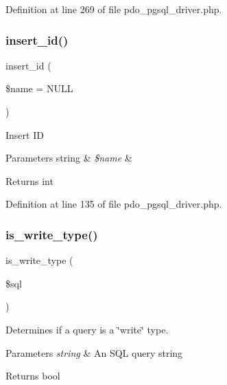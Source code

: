 Definition at line 269 of file pdo\+\_\+pgsql\+\_\+driver.\+php.

\mbox{\label{class_c_i___d_b__pdo__pgsql__driver_ae61dc2c85e5516f143f6246c686bc3fc}} 
\subsubsection{\texorpdfstring{insert\_id()}{insert\_id()}}
{\footnotesize\ttfamily insert\+\_\+id (\begin{DoxyParamCaption}\item[{}]{\$name = {\ttfamily NULL} }\end{DoxyParamCaption})}

Insert ID


\begin{DoxyParams}[1]{Parameters}
string & {\em \$name} & \\
\hline
\end{DoxyParams}
\begin{DoxyReturn}{Returns}
int 
\end{DoxyReturn}


Definition at line 135 of file pdo\+\_\+pgsql\+\_\+driver.\+php.

\mbox{\label{class_c_i___d_b__pdo__pgsql__driver_af435df5703c238769d6d16fde6d51182}} 
\subsubsection{\texorpdfstring{is\_write\_type()}{is\_write\_type()}}
{\footnotesize\ttfamily is\+\_\+write\+\_\+type (\begin{DoxyParamCaption}\item[{}]{\$sql }\end{DoxyParamCaption})}

Determines if a query is a \char`\"{}write\char`\"{} type.


\begin{DoxyParams}{Parameters}
{\em string} & An S\+QL query string \\
\hline
\end{DoxyParams}
\begin{DoxyReturn}{Returns}
bool 
\end{DoxyReturn}


